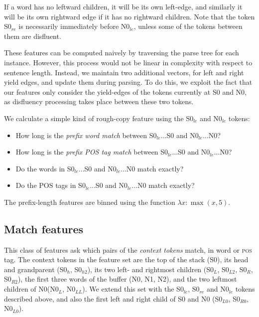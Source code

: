 \documentclass[11pt,letterpaper]{article}
\newcommand{\pos}{\textsc{pos}\xspace}
\newcommand{\szero}{S0\xspace}
\newcommand{\nzero}{N0\xspace}
\newcommand{\szeroH}{S0$_h$\xspace}
\newcommand{\szeroHH}{S0$_{h2}$\xspace}
\newcommand{\szeroL}{S0$_L$\xspace}
\newcommand{\szeroLL}{S0$_{L2}$\xspace}
\newcommand{\szeroR}{S0$_R$\xspace}
\newcommand{\szeroRR}{S0$_{R2}$\xspace}
\newcommand{\szeroLzero}{S0$_{L0}$\xspace}
\newcommand{\szeroRzero}{S0$_{R0}$\xspace}
\newcommand{\nzeroL}{N0$_L$\xspace}
\newcommand{\nzeroLL}{N0$_{LL}$\xspace}
\newcommand{\nzeroLzero}{N0$_{L0}$\xspace}
\newcommand{\szeroRedge}{S0$_{re}$\xspace}
\newcommand{\szeroLedge}{S0$_{le}$\xspace}
\newcommand{\nzeroLedge}{N0$_{le}$\xspace}
\begin{document}
If a word has
no leftward children, it will be its own left-edge, and similarly it will be
its own rightward edge if it has no rightward children. Note that the token
\szeroRedge is necessarily immediately before \nzeroLedge, unless some of the
tokens between them are disfluent.

These features can be computed naively by traversing the parse tree for each
instance. However, this process would not be linear in complexity with respect
to sentence length.  Instead, we maintain two additional vectors, for left
and right yield edges, and update them during parsing.  To do this, we exploit
the fact that our features only consider the yield-edges of the tokens currently
at S0 and N0, as disfluency processing takes place between these two tokens.

We calculate a simple kind of rough-copy feature using the \szeroLedge and
\nzeroLedge tokens:

\begin{itemize}
    \itemsep0em
    \item How long is the \emph{prefix word match} between \szeroLedge...\szero
          and \nzeroLedge...\nzero?
    \item How long is the \emph{prefix POS tag match} between \szeroLedge...\szero
          and \nzeroLedge...\nzero?
    \item Do the words in \szeroLedge...\szero and \nzeroLedge...\nzero match
          exactly?
    \item Do the POS tags in \szeroLedge...\szero and \nzeroLedge...\nzero match
          exactly?
\end{itemize}

The prefix-length features are binned using the function $\lambda x: \max(x, 5)$.

\subsection{Match features}

This class of features ask which pairs of the \emph{context tokens} match, in
word or \pos tag.  The context tokens in the \citet{zhang:11} feature set
are the top of the stack (\szero), its head and grandparent (\szeroH, \szeroHH),
its two left- and rightmost children (\szeroL, \szeroLL, \szeroR, \szeroRR), the
first three words of the buffer (\nzero, N1, N2), and the two leftmost children
of \nzero (\nzeroL, \nzeroLL).
We extend this set with the \szeroLedge, \szeroRedge and \nzeroLedge tokens
described above, and also the first left and right child of \szero and \nzero
(\szeroLzero, \szeroRzero, \nzeroLzero).
\end{document}
